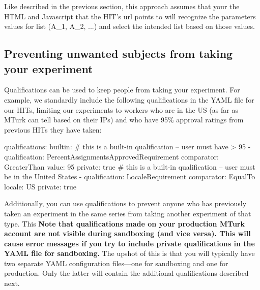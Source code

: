 \documentclass{article}
\newenvironment{code}%
   {\par\noindent\adjustbox{margin=1ex,bgcolor=shadecolor,margin=0ex \medskipamount}\bgroup\minipage\linewidth\verbatim}%
   {\endverbatim\endminipage\egroup}
\begin{document}
Like described in the previous section, this approach assumes that your the HTML and Javascript that the HIT's url points to will recognize the parameters values for list (A\_1, A\_2, ...) and select the intended list based on those values.


\subsection{Preventing unwanted subjects from taking your experiment}
Qualifications can be used to keep people from taking your experiment. For example, we standardly include the following qualifications in the YAML file for our HITs, limiting our experiments to workers who are in the US (as far as MTurk can tell based on their IPs) and who have 95\% approval ratings from previous HITs they have taken:

\begin{code}
qualifications:
  builtin:
   # this is a built-in qualification -- user must have > 95%
   - qualification: PercentAssignmentsApprovedRequirement
     comparator: GreaterThan
     value: 95
     private: true
   # this is a built-in qualification -- user must be in the United States
   - qualification: LocaleRequirement
     comparator: EqualTo
     locale: US
     private: true
\end{code}


Additionally, you can use qualifications to prevent anyone who has previously taken an experiment in the same series from taking another experiment of that type. This \textbf{Note that qualifications made on your production MTurk account are not visible during sandboxing (and vice versa). This will cause error messages if you try to include private qualifications in the YAML file for sandboxing.} The upshot of this is that you will typically have two separate YAML configuration files---one for sandboxing and one for production. Only the latter will contain the additional qualifications described next. 
\end{document}
